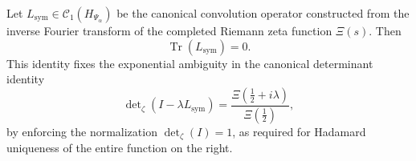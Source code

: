 \begin{theorem}
\label{thm:trace_zero_Lsym}
Let \( L_{\mathrm{sym}} \in \mathcal{C}_1(H_{\Psi_\alpha}) \) be the canonical convolution operator constructed from the inverse Fourier transform of the completed Riemann zeta function \( \Xi(s) \). Then
\[
\operatorname{Tr}(L_{\mathrm{sym}}) = 0.
\]
This identity fixes the exponential ambiguity in the canonical determinant identity
\[
\det\nolimits_{\zeta}(I - \lambda L_{\mathrm{sym}}) = \frac{\Xi(\tfrac{1}{2} + i\lambda)}{\Xi(\tfrac{1}{2})},
\]
by enforcing the normalization \( \det_{\zeta}(I) = 1 \), as required for Hadamard uniqueness of the entire function on the right.
\end{theorem}

